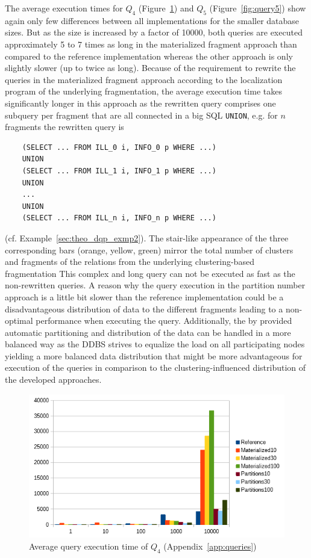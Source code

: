 The average execution times for $Q_4$ (Figure~\ref{fig:query4}) and $Q_5$ (Figure~\ref{fig:query5}) show again only few differences between all 
implementations for the smaller database sizes. But as the size is increased by a factor of 10000, both queries are executed approximately 5 to 7 times as long 
in the materialized fragment approach than compared to the reference implementation whereas the other approach is only slightly slower (up to twice as long).
Because of the requirement to rewrite the queries in the materialized fragment approach according to the localization program of the underlying fragmentation,
the average execution time takes significantly longer in this approach as the rewritten query comprises one subquery per fragment that are all connected in a 
big SQL \verb!UNION!, e.g. for $n$ fragments the rewritten query is
\begin{verbatim}
    (SELECT ... FROM ILL_0 i, INFO_0 p WHERE ...)
    UNION
    (SELECT ... FROM ILL_1 i, INFO_1 p WHERE ...)
    UNION
    ...
    UNION
    (SELECT ... FROM ILL_n i, INFO_n p WHERE ...)
\end{verbatim}
(cf. Example~\ref{sec:theo_dqp_exmp2}). The stair-like appearance of the three corresponding bars (orange, yellow, green) mirror the total number of clusters 
and fragments of the relations from the underlying clustering-based fragmentation This complex and long query can not be executed as fast as the non-rewritten
queries. A reason why the query execution in the partition number approach is a little bit slower than the reference implementation could be a disadvantageous
distribution of data to the different fragments leading to a non-optimal performance when executing the query. Additionally, the by  provided
automatic partitioning and distribution of the data can be handled in a more balanced way as the DDBS strives to equalize the load on all participating nodes
yielding a more balanced data distribution that might be more advantageous for execution of the queries in comparison to the clustering-influenced distribution
of the developed approaches.
\begin{figure}[h]
    \centering
    \includegraphics[scale=0.8]{charts/Query4.png}
    \caption{Average query execution time of $Q_4$ (Appendix~\ref{app:queries})}
    \label{fig:query4}
\end{figure}

